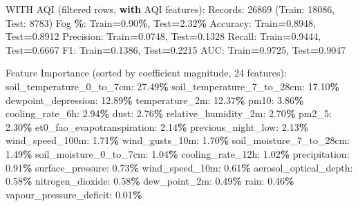 \documentclass[
  letterpaper,
  DIV=11,
  numbers=noendperiod]{scrartcl}
\newenvironment{Shaded}{\begin{snugshade}}{\end{snugshade}}
\newcommand{\BuiltInTok}[1]{#1}
\newcommand{\ControlFlowTok}[1]{\textcolor[rgb]{0.13,0.29,0.53}{\textbf{#1}}}
\newcommand{\DecValTok}[1]{\textcolor[rgb]{0.00,0.00,0.81}{#1}}
\newcommand{\FloatTok}[1]{\textcolor[rgb]{0.00,0.00,0.81}{#1}}
\newcommand{\NormalTok}[1]{#1}
\newcommand{\OperatorTok}[1]{\textcolor[rgb]{0.81,0.36,0.00}{\textbf{#1}}}
\begin{document}
\begin{Shaded}
\begin{Highlighting}[]
\NormalTok{WITH AQI (filtered rows, }\ControlFlowTok{with}\NormalTok{ AQI features):}
\NormalTok{  Records: }\DecValTok{26869}\NormalTok{ (Train: }\DecValTok{18086}\NormalTok{, Test: }\DecValTok{8783}\NormalTok{)}
\NormalTok{  Fog }\OperatorTok{\%}\NormalTok{: Train}\OperatorTok{=}\FloatTok{0.90}\OperatorTok{\%}\NormalTok{, Test}\OperatorTok{=}\FloatTok{2.32}\OperatorTok{\%}
\NormalTok{  Accuracy: Train}\OperatorTok{=}\FloatTok{0.8948}\NormalTok{, Test}\OperatorTok{=}\FloatTok{0.8912}
\NormalTok{  Precision: Train}\OperatorTok{=}\FloatTok{0.0748}\NormalTok{, Test}\OperatorTok{=}\FloatTok{0.1328}
\NormalTok{  Recall: Train}\OperatorTok{=}\FloatTok{0.9444}\NormalTok{, Test}\OperatorTok{=}\FloatTok{0.6667}
\NormalTok{  F1: Train}\OperatorTok{=}\FloatTok{0.1386}\NormalTok{, Test}\OperatorTok{=}\FloatTok{0.2215}
\NormalTok{  AUC: Train}\OperatorTok{=}\FloatTok{0.9725}\NormalTok{, Test}\OperatorTok{=}\FloatTok{0.9047}

\NormalTok{  Feature Importance (}\BuiltInTok{sorted}\NormalTok{ by coefficient magnitude, }\DecValTok{24}\NormalTok{ features):}
\NormalTok{    soil\_temperature\_0\_to\_7cm: }\FloatTok{27.49}\OperatorTok{\%}
\NormalTok{    soil\_temperature\_7\_to\_28cm: }\FloatTok{17.10}\OperatorTok{\%}
\NormalTok{    dewpoint\_depression: }\FloatTok{12.89}\OperatorTok{\%}
\NormalTok{    temperature\_2m: }\FloatTok{12.37}\OperatorTok{\%}
\NormalTok{    pm10: }\FloatTok{3.86}\OperatorTok{\%}
\NormalTok{    cooling\_rate\_6h: }\FloatTok{2.94}\OperatorTok{\%}
\NormalTok{    dust: }\FloatTok{2.76}\OperatorTok{\%}
\NormalTok{    relative\_humidity\_2m: }\FloatTok{2.70}\OperatorTok{\%}
\NormalTok{    pm2\_5: }\FloatTok{2.30}\OperatorTok{\%}
\NormalTok{    et0\_fao\_evapotranspiration: }\FloatTok{2.14}\OperatorTok{\%}
\NormalTok{    previous\_night\_low: }\FloatTok{2.13}\OperatorTok{\%}
\NormalTok{    wind\_speed\_100m: }\FloatTok{1.71}\OperatorTok{\%}
\NormalTok{    wind\_gusts\_10m: }\FloatTok{1.70}\OperatorTok{\%}
\NormalTok{    soil\_moisture\_7\_to\_28cm: }\FloatTok{1.49}\OperatorTok{\%}
\NormalTok{    soil\_moisture\_0\_to\_7cm: }\FloatTok{1.04}\OperatorTok{\%}
\NormalTok{    cooling\_rate\_12h: }\FloatTok{1.02}\OperatorTok{\%}
\NormalTok{    precipitation: }\FloatTok{0.91}\OperatorTok{\%}
\NormalTok{    surface\_pressure: }\FloatTok{0.73}\OperatorTok{\%}
\NormalTok{    wind\_speed\_10m: }\FloatTok{0.61}\OperatorTok{\%}
\NormalTok{    aerosol\_optical\_depth: }\FloatTok{0.58}\OperatorTok{\%}
\NormalTok{    nitrogen\_dioxide: }\FloatTok{0.58}\OperatorTok{\%}
\NormalTok{    dew\_point\_2m: }\FloatTok{0.49}\OperatorTok{\%}
\NormalTok{    rain: }\FloatTok{0.46}\OperatorTok{\%}
\NormalTok{    vapour\_pressure\_deficit: }\FloatTok{0.01}\OperatorTok{\%}


\end{Highlighting}
\end{Shaded}
\end{document}
